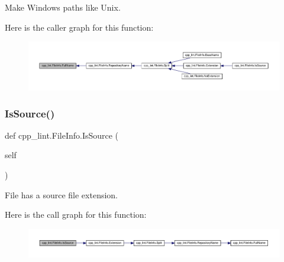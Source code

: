 \begin{DoxyVerb}Make Windows paths like Unix.\end{DoxyVerb}
 Here is the caller graph for this function\+:
\nopagebreak
\begin{figure}[H]
\begin{center}
\leavevmode
\includegraphics[width=350pt]{classcpp__lint_1_1_file_info_a36b6595254838baeb10a7b4df6c97e46_icgraph}
\end{center}
\end{figure}
\mbox{\label{classcpp__lint_1_1_file_info_aa00d8322dc7ee1b1f523ea5c2a38c36a}} 
\subsubsection{\texorpdfstring{Is\+Source()}{IsSource()}}
{\footnotesize\ttfamily def cpp\+\_\+lint.\+File\+Info.\+Is\+Source (\begin{DoxyParamCaption}\item[{}]{self }\end{DoxyParamCaption})}

\begin{DoxyVerb}File has a source file extension.\end{DoxyVerb}
 Here is the call graph for this function\+:
\nopagebreak
\begin{figure}[H]
\begin{center}
\leavevmode
\includegraphics[width=350pt]{classcpp__lint_1_1_file_info_aa00d8322dc7ee1b1f523ea5c2a38c36a_cgraph}
\end{center}
\end{figure}
\mbox{\label{classcpp__lint_1_1_file_info_a211532e8ea7f3ca3e02124bb3ff55426}} 
